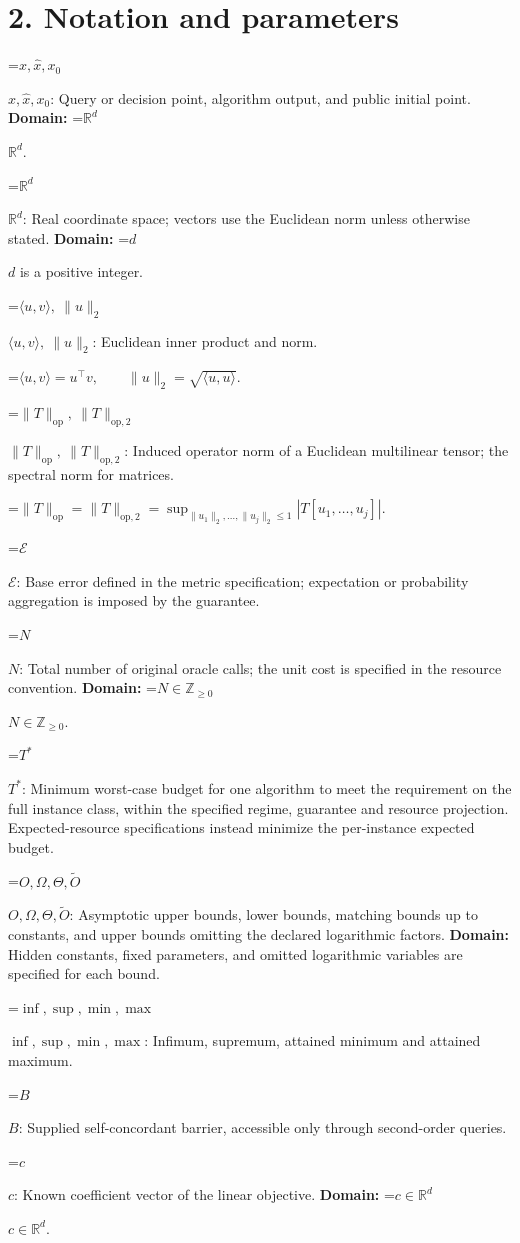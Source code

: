 \documentclass[10pt,a4paper]{article}
\newcommand{\AtlasMath}[1]{\par\begingroup\centering\setbox0=\hbox{$\displaystyle #1$}\ifdim\wd0>1.4\linewidth\typeout{ATLAS WIDE FORMULA: \the\wd0}\fi\ifdim\wd0>\linewidth\resizebox{\linewidth}{!}{\box0}\else\box0\fi\par\endgroup}
\newcommand{\AtlasInlineMath}[1]{\begingroup\setbox0=\hbox{$#1$}\ifdim\wd0>.4\linewidth\endgroup\AtlasMath{#1}\else\endgroup$#1$\fi}
\begin{document}
\section{2. Notation and parameters}
\AtlasInlineMath{x,\widehat{x},x_0}: Query or decision point, algorithm output, and public initial point. \textbf{Domain:} \AtlasInlineMath{\mathbb{R}^d}.

\AtlasInlineMath{\mathbb{R}^d}: Real coordinate space; vectors use the Euclidean norm unless otherwise stated. \textbf{Domain:} \AtlasInlineMath{d} is a positive integer.

\AtlasInlineMath{\langle u,v\rangle,\ \|u\|_2}: Euclidean inner product and norm.


\AtlasMath{\langle u,v\rangle=u^\top v,\qquad\|u\|_2=\sqrt{\langle u,u\rangle}.}


\AtlasInlineMath{\|T\|_{\mathrm{op}},\ \|T\|_{\mathrm{op},2}}: Induced operator norm of a Euclidean multilinear tensor; the spectral norm for matrices.


\AtlasMath{\|T\|_{\mathrm{op}}=\|T\|_{\mathrm{op},2}=\sup_{\|u_1\|_2,\ldots,\|u_j\|_2\le1}|T[u_1,\ldots,u_j]|.}


\AtlasInlineMath{\mathcal{E}}: Base error defined in the metric specification; expectation or probability aggregation is imposed by the guarantee.

\AtlasInlineMath{N}: Total number of original oracle calls; the unit cost is specified in the resource convention. \textbf{Domain:} \AtlasInlineMath{N\in\mathbb{Z}_{\ge0}}.

\AtlasInlineMath{T^*}: Minimum worst-case budget for one algorithm to meet the requirement on the full instance class, within the specified regime, guarantee and resource projection. Expected-resource specifications instead minimize the per-instance expected budget.

\AtlasInlineMath{O,\Omega,\Theta,\widetilde{O}}: Asymptotic upper bounds, lower bounds, matching bounds up to constants, and upper bounds omitting the declared logarithmic factors. \textbf{Domain:} Hidden constants, fixed parameters, and omitted logarithmic variables are specified for each bound.

\AtlasInlineMath{\inf,\sup,\min,\max}: Infimum, supremum, attained minimum and attained maximum.

\AtlasInlineMath{B}: Supplied self-concordant barrier, accessible only through second-order queries.

\AtlasInlineMath{c}: Known coefficient vector of the linear objective. \textbf{Domain:} \AtlasInlineMath{c\in\mathbb{R}^d}.
\end{document}
